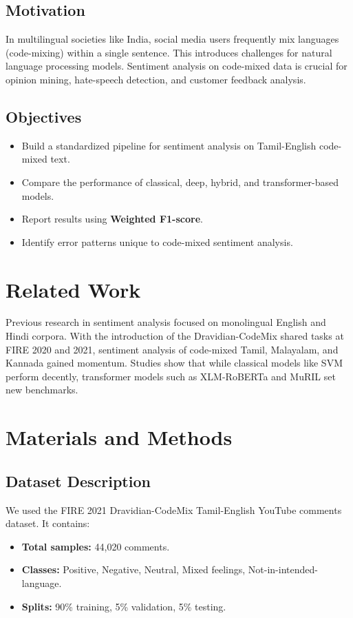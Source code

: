 \documentclass[12pt,a4paper]{article}
\begin{document}
\subsection{Motivation}
In multilingual societies like India, social media users frequently mix languages (code-mixing) within a single sentence. This introduces challenges for natural language processing models. Sentiment analysis on code-mixed data is crucial for opinion mining, hate-speech detection, and customer feedback analysis.

\subsection{Objectives}
\begin{itemize}
    \item Build a standardized pipeline for sentiment analysis on Tamil-English code-mixed text.
    \item Compare the performance of classical, deep, hybrid, and transformer-based models.
    \item Report results using \textbf{Weighted F1-score}.
    \item Identify error patterns unique to code-mixed sentiment analysis.
\end{itemize}

\section{Related Work}
Previous research in sentiment analysis focused on monolingual English and Hindi corpora. With the introduction of the Dravidian-CodeMix shared tasks at FIRE 2020 and 2021, sentiment analysis of code-mixed Tamil, Malayalam, and Kannada gained momentum. Studies show that while classical models like SVM perform decently, transformer models such as XLM-RoBERTa and MuRIL set new benchmarks.

\section{Materials and Methods}
\subsection{Dataset Description}
We used the FIRE 2021 Dravidian-CodeMix Tamil-English YouTube comments dataset. It contains:
\begin{itemize}
    \item \textbf{Total samples:} 44,020 comments.
    \item \textbf{Classes:} Positive, Negative, Neutral, Mixed feelings, Not-in-intended-language.
    \item \textbf{Splits:} 90\% training, 5\% validation, 5\% testing.
\end{itemize}
\end{document}
